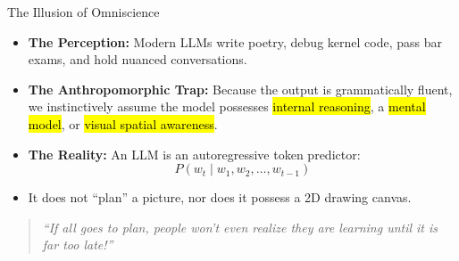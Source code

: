 \documentclass[aspectratio=169,11pt,xcolor={table,dvipsnames}]{beamer}
\begin{document}
\begin{frame}{The Illusion of Omniscience}
  \begin{itemize}
    \item \textbf{The Perception:} Modern LLMs write poetry, debug kernel code, pass bar exams, and hold nuanced conversations.
    \item \textbf{The Anthropomorphic Trap:} Because the output is grammatically fluent, we instinctively assume the model possesses \hl{internal reasoning}, a \hl{mental model}, or \hl{visual spatial awareness}.
    \item \textbf{The Reality:} An LLM is an autoregressive token predictor:
      \[
        P(w_t \mid w_1, w_2, \dots, w_{t-1})
      \]
    \item It does not ``plan'' a picture, nor does it possess a 2D drawing canvas.
  \end{itemize}

  \vspace{0.3cm}
  \begin{quote}
    \small\textit{``If all goes to plan, people won't even realize they are learning until it is far too late!''}%
  \end{quote}
\end{frame}
\end{document}
